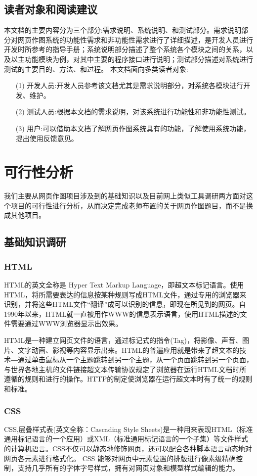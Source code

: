 \documentclass[lang=cn]{elegantpaper}
\begin{document}
\subsection{读者对象和阅读建议}
本文档的主要内容分为三个部分:需求说明、系统说明、和测试部分。需求说明部分对网页作图系统的功能性需求和非功能性需求进行了详细描述，是开发人员进行开发时所参考的指导手册；系统说明部分描述了整个系统各个模块之间的关系，以及以主功能模块为例，对其中主要的程序接口进行说明；测试部分描述对系统进行测试的主要目的、方法、和过程。
本文档面向多类读者对象:
\begin{itemize}
	\item [(1)]开发人员:开发人员参考该文档尤其是需求说明部分，对系统各模块进行开发、维护。
	\item [(2)]测试人员:根据本文档的需求说明，对该系统进行功能性和非功能性测试。
	\item [(3)]用户:可以借助本文档了解网页作图系统具有的功能，了解使用系统功能，提出使用反馈意见。
\end{itemize}

\section{可行性分析}
我们主要从网页作图项目涉及到的基础知识以及目前网上类似工具调研两方面对这个项目的可行性进行分析，从而决定完成老师布置的关于网页作图题目，而不是换成其他项目。
\subsection{基础知识调研}
\subsubsection{HTML}
HTML的英文全称是 Hyper Text Markup Language，即超文本标记语言。使用HTML，将所需要表达的信息按某种规则写成HTML文件，通过专用的浏览器来识别，并将这些HTML文件“翻译”成可以识别的信息，即现在所见到的网页。自1990年以来，HTML就一直被用作WWW的信息表示语言，使用HTML描述的文件需要通过WWW浏览器显示出效果。

HTML是一种建立网页文件的语言，通过标记式的指令(Tag)，将影像、声音、图片、文字动画、影视等内容显示出来。HTML的普遍应用就是带来了超文本的技术―通过单击鼠标从一个主题跳转到另一个主题，从一个页面跳转到另一个页面，与世界各地主机的文件链接超文本传输协议规定了浏览器在运行HTML文档时所遵循的规则和进行的操作。HTTP的制定使浏览器在运行超文本时有了统一的规则和标准。

\subsubsection{CSS}
CSS,层叠样式表(英文全称：Cascading Style Sheets)是一种用来表现HTML（标准通用标记语言的一个应用）或XML（标准通用标记语言的一个子集）等文件样式的计算机语言。CSS不仅可以静态地修饰网页，还可以配合各种脚本语言动态地对网页各元素进行格式化。 CSS 能够对网页中元素位置的排版进行像素级精确控制，支持几乎所有的字体字号样式，拥有对网页对象和模型样式编辑的能力。
\end{document}
